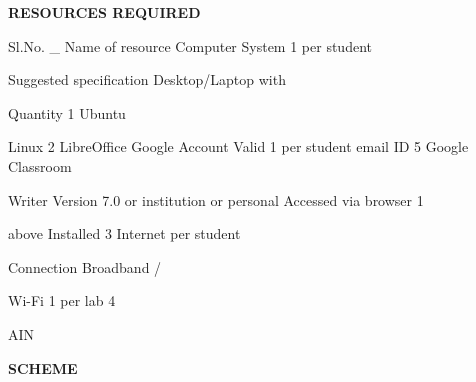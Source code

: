 \documentclass[10pt,a4paper]{article}
\begin{document}
\medskip\noindent\textbf{RESOURCES REQUIRED}\par
\noindent Sl.No.                       \_ Name of resource        Computer System            1 per student\par
\noindent Suggested specification   Desktop/Laptop with\par
\noindent Quantity 1                Ubuntu\par

\noindent Linux 2 LibreOffice          Google Account Valid      1 per student email ID 5   Google Classroom\par
\noindent Writer Version 7.0 or        institution or personal                              Accessed via browser 1\par
\noindent above Installed 3 Internet                                                        per student\par
\noindent Connection Broadband /\par
\noindent Wi-Fi 1 per lab 4\par

\noindent AIN\par
\medskip\noindent\textbf{SCHEME}\par
\end{document}
